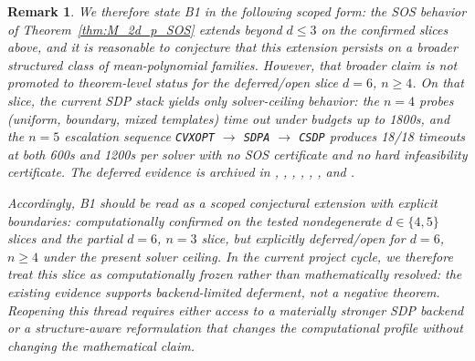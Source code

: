 \documentclass{article}
\newtheorem{remark}{Remark}
\begin{document}
\begin{remark}
We therefore state B1 in the following scoped form: the SOS behavior of
Theorem~\ref{thm:M_2d_p_SOS} extends beyond $d\leq 3$ on the confirmed slices
above, and it is reasonable to conjecture that this extension persists on a
broader structured class of mean-polynomial families. However, that broader
claim is not promoted to theorem-level status for the deferred/open slice
$d=6$, $n\geq 4$. On that slice, the current SDP stack yields only solver-ceiling
behavior: the $n=4$ probes (uniform, boundary, mixed templates) time out under
budgets up to 1800s, and the $n=5$ escalation sequence
\texttt{CVXOPT} $\rightarrow$ \texttt{SDPA} $\rightarrow$ \texttt{CSDP}
produces 18/18 timeouts at both 600s and 1200s per solver with no SOS certificate
and no hard infeasibility certificate. The deferred evidence is archived in
,
,
,
,
,
, and
.

Accordingly, B1 should be read as a scoped conjectural extension with explicit
boundaries: computationally confirmed on the tested nondegenerate
$d\in\{4,5\}$ slices and the partial $d=6$, $n=3$ slice, but explicitly
deferred/open for $d=6$, $n\geq 4$ under the present solver ceiling. In the
current project cycle, we therefore treat this slice as computationally frozen
rather than mathematically resolved: the existing evidence supports backend-limited
deferment, not a negative theorem. Reopening this thread requires either access
to a materially stronger SDP backend or a structure-aware reformulation that
changes the computational profile without changing the mathematical claim.


\end{remark}
\end{document}
